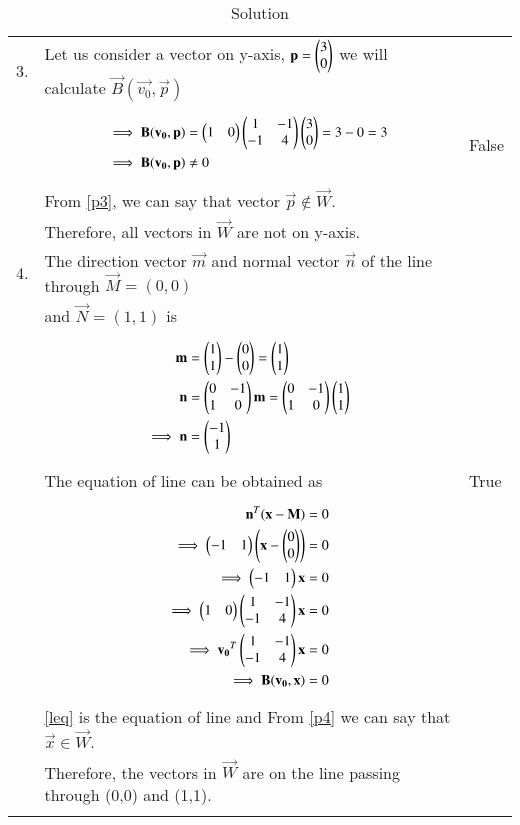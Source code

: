 \documentclass[journal,12pt]{IEEEtran}
\begin{document}
\begin{longtable}{|l|l|l|}
\hline
3.&Let us consider a vector on y-axis, $\mathbf{p}=\begin{pmatrix}3\\0\end{pmatrix}$ we will calculate $\vec{B}(\vec{v_0},\vec{p})$&\\&\parbox{13cm}{\begin{align}
    \implies\mathbf{B}(\mathbf{v_0},\mathbf{p})&=\begin{pmatrix}1&0\end{pmatrix}\begin{pmatrix}1&-1\\-1&4\end{pmatrix}\begin{pmatrix}3\\0\end{pmatrix}=3-0=3\\
    \implies\mathbf{B}(\mathbf{v_0},\mathbf{p})&\neq0\label{p3}
\end{align}}&False\\&From \eqref{p3}, we can say that vector $\vec{p}\not\in\vec{W}$.&\\&Therefore, all vectors in $\vec{W}$ are not on y-axis.&\\
.&The direction vector $\vec{m}$ and normal vector $\vec{n}$ of the line through $\vec{M}=(0,0)$&\\& and $\vec{N}=(1,1)$ is&\\&\parbox{13cm}{\begin{align}
    \mathbf{m}&=\begin{pmatrix}1\\1\end{pmatrix}-\begin{pmatrix}0\\0\end{pmatrix}=\begin{pmatrix}1\\1\end{pmatrix}\\
    \mathbf{n}&=\begin{pmatrix}0&-1\\1&0\end{pmatrix}\mathbf{m}=\begin{pmatrix}0&-1\\1&0\end{pmatrix}\begin{pmatrix}1\\1\end{pmatrix}\\
    \implies\mathbf{n}&=\begin{pmatrix}-1\\1\end{pmatrix}
\end{align}}&\\&The equation of line can be obtained as&True\\&\parbox{13cm}{\begin{align}
    \mathbf{n}^T(\mathbf{x}-\mathbf{M})&=0\\
    \implies\begin{pmatrix}-1&1\end{pmatrix}\left(\mathbf{x}-\begin{pmatrix}0\\0\end{pmatrix}\right)&=0\\
    \implies\begin{pmatrix}-1&1\end{pmatrix}\mathbf{x}&=0\label{leq}\\
    \implies\begin{pmatrix}1&0\end{pmatrix}\begin{pmatrix}1&-1\\-1&4\end{pmatrix}\mathbf{x}&=0\\
    \implies\mathbf{v_0}^T\begin{pmatrix}1&-1\\-1&4\end{pmatrix}\mathbf{x}&=0\\
    \implies\mathbf{B}(\mathbf{v_0},\mathbf{x})&=0\label{p4}
\end{align}}&\\&\eqref{leq} is the equation of line and From \eqref{p4} we can say that $\vec{x}\in\vec{W}$.&\\&Therefore, the vectors in $\vec{W}$ are on the line passing through (0,0) and (1,1).&\\
\hline
\caption{Solution}
\label{sol}
\end{longtable}
\end{document}
